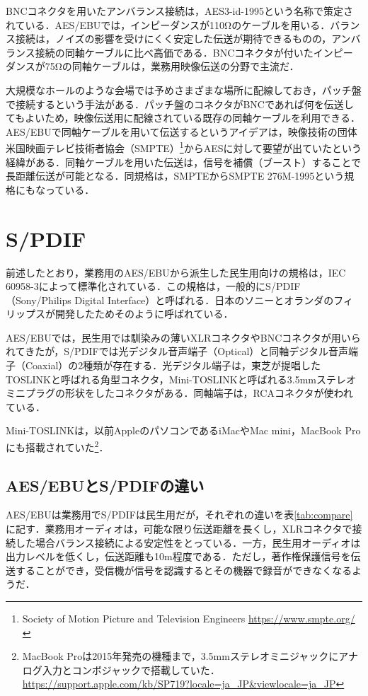 BNCコネクタを用いたアンバランス接続は，AES3-id-1995という名称で策定されている．AES/EBUでは，インピーダンスが110Ωのケーブルを用いる．バランス接続は，ノイズの影響を受けにくく安定した伝送が期待できるものの，アンバランス接続の同軸ケーブルに比べ高価である．BNCコネクタが付いたインピーダンスが75Ωの同軸ケーブルは，業務用映像伝送の分野で主流だ．

大規模なホールのような会場では予めさまざまな場所に配線しておき，パッチ盤で接続するという手法がある．パッチ盤のコネクタがBNCであれば何を伝送してもよいため，映像伝送用に配線されている既存の同軸ケーブルを利用できる．AES/EBUで同軸ケーブルを用いて伝送するというアイデアは，映像技術の団体米国映画テレビ技術者協会（SMPTE）\footnote{Society of Motion Picture and Television Engineers \url{https://www.smpte.org/}}からAESに対して要望が出ていたという経緯がある\cite{aes3id-1995-column}．同軸ケーブルを用いた伝送は，信号を補償（ブースト）することで長距離伝送が可能となる．同規格は，SMPTEからSMPTE 276M-1995という規格にもなっている．

\section{S/PDIF}

前述したとおり，業務用のAES/EBUから派生した民生用向けの規格は，IEC 60958-3によって標準化されている．この規格は，一般的にS/PDIF（Sony/Philips Digital Interface）と呼ばれる．日本のソニーとオランダのフィリップスが開発したためそのように呼ばれている．

AES/EBUでは，民生用では馴染みの薄いXLRコネクタやBNCコネクタが用いられてきたが，S/PDIFでは光デジタル音声端子（Optical）と同軸デジタル音声端子（Coaxial）の2種類が存在する．光デジタル端子は，東芝が提唱したTOSLINKと呼ばれる角型コネクタ，Mini-TOSLINKと呼ばれる3.5mmステレオミニプラグの形状をしたコネクタがある．同軸端子は，RCAコネクタが使われている．

Mini-TOSLINKは，以前AppleのパソコンであるiMacやMac mini，MacBook Proにも搭載されていた\footnote{MacBook Proは2015年発売の機種まで，3.5mmステレオミニジャックにアナログ入力とコンボジャックで搭載していた． \url{https://support.apple.com/kb/SP719?locale=ja_JP&viewlocale=ja_JP}}．

\subsection{AES/EBUとS/PDIFの違い}

AES/EBUは業務用でS/PDIFは民生用だが，それぞれの違いを表\ref{tab:compare}に記す．業務用オーディオは，可能な限り伝送距離を長くし，XLRコネクタで接続した場合バランス接続による安定性をとっている．一方，民生用オーディオは出力レベルを低くし，伝送距離も10m程度である．ただし，著作権保護信号を伝送することができ，受信機が信号を認識するとその機器で録音ができなくなるようだ．

